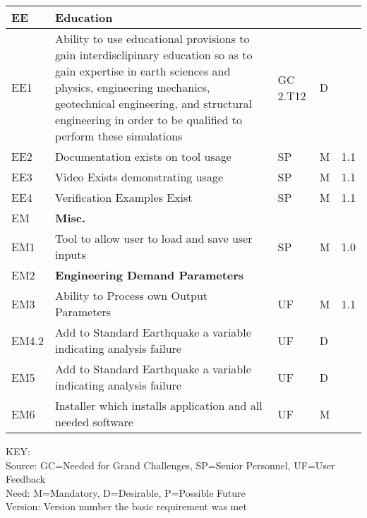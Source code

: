 \begin{longtable}{| p{} | p{} | p{} | p{} |  p{} |}
    EE & \textbf{Education} &  &  \\ \hline
    EE1 & Ability to use educational provisions to gain interdisclipinary education so as to gain expertise in earth sciences and physics, engineering mechanics, geotechnical engineering, and structural engineering in order to be qualified to perform these simulations & GC 2.T12 & D & \\ \hline
    EE2 & Documentation exists on tool usage & SP & M & 1.1  \\ \hline
    EE3 & Video Exists demonstrating usage & SP & M & 1.1  \\ \hline
    EE4 & Verification Examples Exist & SP & M & 1.1  \\ \hline
    EM & \textbf{Misc.} &  &  \\ \hline
    EM1 & Tool to allow user to load and save user inputs & SP & M & 1.0 \\ \hline
    EM2 & \textbf{Engineering Demand Parameters} &  &  \\ \hline
    EM3 & Ability to Process own Output Parameters & UF & M & 1.1  \\ \hline
    EM4.2 & Add to Standard Earthquake a variable indicating analysis failure & UF & D &   \\ \hline
    EM5 & Add to Standard Earthquake a variable indicating analysis failure & UF & D &   \\ \hline
    EM6 & Installer which installs application and all needed software & UF & M &   \\ \hline
      
  \bottomrule 
               
\end{longtable}

\noindent
KEY:\\
Source: GC=Needed for Grand Challenges, SP=Senior Personnel, UF=User Feedback \\
Need: M=Mandatory, D=Desirable, P=Possible Future \\
Version: Version number the basic requirement was met 
